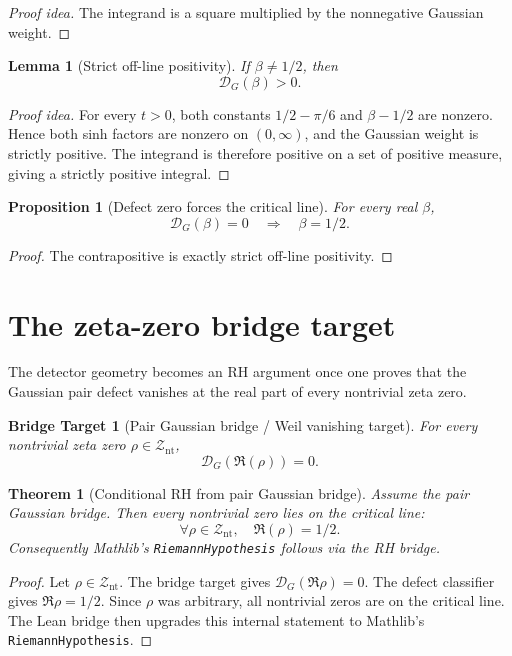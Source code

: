 \documentclass[11pt]{article}
\newtheorem{theorem}{Theorem}
\newtheorem{lemma}{Lemma}
\newtheorem{proposition}{Proposition}
\newtheorem{conjecture}{Bridge Target}
\newcommand{\NTZ}{\mathcal Z_{\mathrm{nt}}}
\newcommand{\gpdef}{\mathcal D_G}
\begin{document}
\begin{proof}[Proof idea]
The integrand is a square multiplied by the nonnegative Gaussian weight.
\end{proof}

\begin{lemma}[Strict off-line positivity]
If \(\beta\ne1/2\), then
\[
  \gpdef(\beta)>0.
\]
\end{lemma}

\begin{proof}[Proof idea]
For every \(t>0\), both constants
\(1/2-\pi/6\) and \(\beta-1/2\) are nonzero.  Hence both sinh factors are
nonzero on \((0,\infty)\), and the Gaussian weight is strictly positive.  The
integrand is therefore positive on a set of positive measure, giving a strictly
positive integral.
\end{proof}

\begin{proposition}[Defect zero forces the critical line]
For every real \(\beta\),
\[
  \gpdef(\beta)=0 \quad\Longrightarrow\quad \beta=1/2.
\]
\end{proposition}

\begin{proof}
The contrapositive is exactly strict off-line positivity.
\end{proof}

\section{The zeta-zero bridge target}

The detector geometry becomes an RH argument once one proves that the Gaussian pair
defect vanishes at the real part of every nontrivial zeta zero.

\begin{conjecture}[Pair Gaussian bridge / Weil vanishing target]
For every nontrivial zeta zero \(\rho\in\NTZ\),
\[
  \gpdef(\Re(\rho))=0.
\]
\end{conjecture}

\begin{theorem}[Conditional RH from pair Gaussian bridge]
Assume the pair Gaussian bridge.  Then every nontrivial zero lies on the critical line:
\[
  \forall \rho\in\NTZ,\quad \Re(\rho)=1/2.
\]
Consequently Mathlib's \texttt{RiemannHypothesis} follows via the RH bridge.
\end{theorem}

\begin{proof}
Let \(\rho\in\NTZ\).  The bridge target gives \(\gpdef(\Re\rho)=0\).  The defect
classifier gives \(\Re\rho=1/2\).  Since \(\rho\) was arbitrary, all nontrivial
zeros are on the critical line.  The Lean bridge then upgrades this internal statement
to Mathlib's \texttt{RiemannHypothesis}.
\end{proof}
\end{document}
